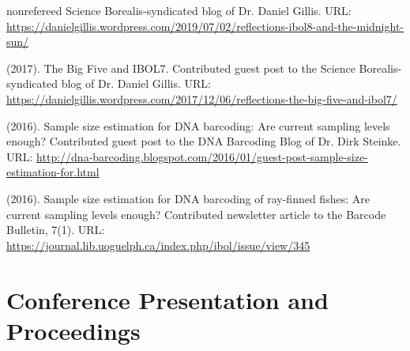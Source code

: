 \begin{revlist}[itemsep=0.45\baselineskip]{nonrefereed}
  Science Borealis-syndicated blog of Dr. Daniel Gillis. URL:
  \url{https://danielgillis.wordpress.com/2019/07/02/reflections-ibol8-and-the-midnight-sun/}
\item \me (2017). The Big Five and IBOL7. Contributed guest post to the Science
  Borealis-syndicated blog of Dr. Daniel Gillis. URL:
  \url{https://danielgillis.wordpress.com/2017/12/06/reflections-the-big-five-and-ibol7/}
\item \me (2016). Sample size estimation for DNA barcoding: Are current sampling
  levels enough? Contributed guest post to the DNA Barcoding Blog of
  Dr. Dirk Steinke. URL:
  \url{http://dna-barcoding.blogspot.com/2016/01/guest-post-sample-size-estimation-for.html}
\item \me (2016). Sample size estimation for DNA barcoding of ray-finned fishes:
  Are current sampling levels enough? Contributed newsletter article to the
  Barcode Bulletin, 7(1). URL:
  \url{https://journal.lib.uoguelph.ca/index.php/ibol/issue/view/345}
\end{revlist}


\section{Conference Presentation and Proceedings}
\legenddirect

